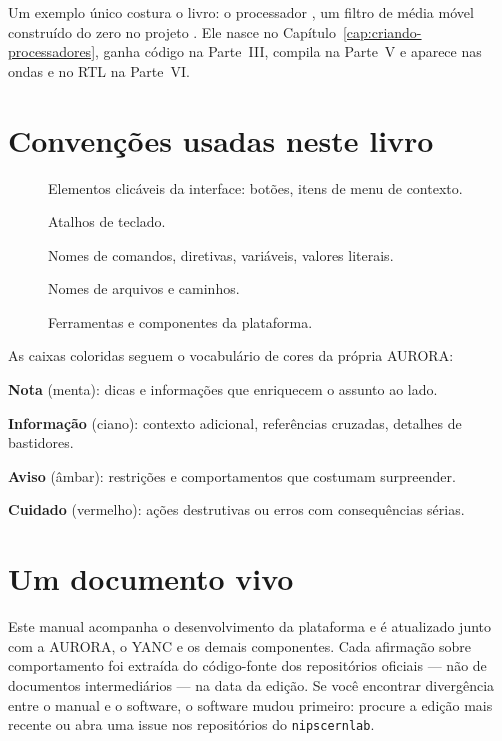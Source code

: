 Um exemplo único costura o livro: o processador , um filtro de média móvel construído do zero no projeto . Ele nasce no Capítulo~\ref{cap:criando-processadores}, ganha código na Parte~III, compila na Parte~V e aparece nas ondas e no RTL na Parte~VI.

\section*{Convenções usadas neste livro}

\begin{description}
  \item[] Elementos clicáveis da interface: botões, itens de menu de contexto.
  \item[] Atalhos de teclado.
  \item[] Nomes de comandos, diretivas, variáveis, valores literais.
  \item[] Nomes de arquivos e caminhos.
  \item[] Ferramentas e componentes da plataforma.
\end{description}

As caixas coloridas seguem o vocabulário de cores da própria AURORA:

\begin{nota}
\textbf{Nota} (menta): dicas e informações que enriquecem o assunto ao lado.
\end{nota}

\begin{info}
\textbf{Informação} (ciano): contexto adicional, referências cruzadas, detalhes de bastidores.
\end{info}

\begin{aviso}
\textbf{Aviso} (âmbar): restrições e comportamentos que costumam surpreender.
\end{aviso}

\begin{perigo}
\textbf{Cuidado} (vermelho): ações destrutivas ou erros com consequências sérias.
\end{perigo}

\section*{Um documento vivo}

Este manual acompanha o desenvolvimento da plataforma e é atualizado junto com a AURORA, o YANC e os demais componentes. Cada afirmação sobre comportamento foi extraída do código-fonte dos repositórios oficiais --- não de documentos intermediários --- na data da edição. Se você encontrar divergência entre o manual e o software, o software mudou primeiro: procure a edição mais recente ou abra uma issue nos repositórios do \texttt{nipscernlab}.
